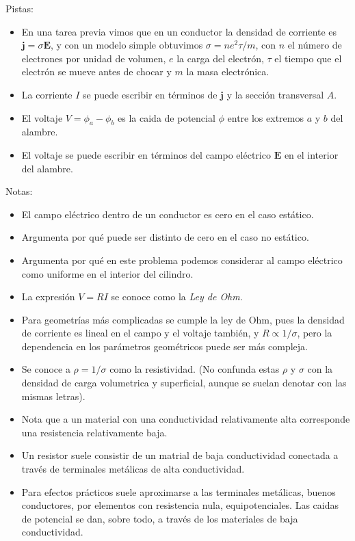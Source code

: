 \documentclass{exam}
\begin{document}
\begin{questions}
  Pistas:
  \begin{itemize}
  \item En una tarea previa vimos que en un conductor la densidad de
    corriente es $\bm j=\sigma\bm E$, y con un modelo simple obtuvimos
    $\sigma=ne^2\tau/m$, con $n$ el número de electrones por unidad de
    volumen, $e$ la carga del electrón, $\tau$ el tiempo que el
    electrón se mueve antes de chocar y $m$ la masa electrónica.
  \item La corriente $I$ se puede escribir en términos de $\bm j$ y la
    sección transversal $A$.
  \item El voltaje $V=\phi_a-\phi_b$ es la caida de potencial $\phi$
    entre los extremos $a$ y $b$ del alambre.
  \item El voltaje se puede escribir en términos del campo eléctrico
    $\bm E$ en el interior del alambre.
  \end{itemize}
  Notas:
  \begin{itemize}
  \item El campo eléctrico dentro de un conductor es cero en el caso
    estático.
  \item Argumenta por qué puede ser distinto de cero en el caso no
    estático.
  \item Argumenta por qué en este problema podemos considerar al campo
    eléctrico como uniforme en el interior del cilindro.
  \item La expresión $V=RI$ se conoce como la {\em Ley de Ohm}.
  \item Para geometrías más complicadas se cumple la ley de Ohm, pues
    la densidad de corriente es lineal en el campo y el voltaje
    también, y $R\propto 1/\sigma$, pero la dependencia en los parámetros
    geométricos puede ser más compleja.
  \item Se conoce a $\rho=1/\sigma$ como la resistividad. (No confunda
    estas $\rho$ y $\sigma$ con la densidad de carga volumetrica y
    superficial, aunque se suelan denotar con las mismas letras).
  \item Nota que a un material con una conductividad relativamente alta
    corresponde  una resistencia relativamente baja.
  \item Un resistor suele consistir de un matrial de baja
    conductividad conectada a través de terminales metálicas de alta
    conductividad.
  \item Para efectos prácticos suele aproximarse a
    las terminales metálicas, buenos conductores, por elementos con
    resistencia nula, equipotenciales. Las caidas de potencial se dan,
    sobre todo, a través de los materiales de baja conductividad.
  \end{itemize}


\end{questions}
\end{document}
